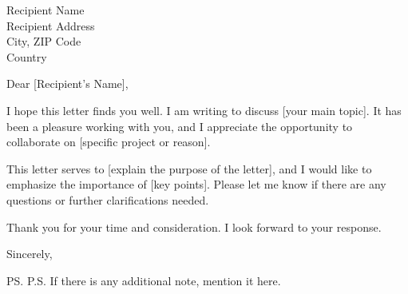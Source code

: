 \documentclass{letter}
\date{\today}
\begin{document}
%
    \begin{letter}{Recipient Name \\ Recipient Address \\ City, ZIP Code \\ Country}
        \opening{Dear [Recipient's Name],}

        I hope this letter finds you well. I am writing to discuss [your main topic]. It has been a pleasure working with you, and I appreciate the opportunity to collaborate on [specific project or reason].
        
        This letter serves to [explain the purpose of the letter], and I would like to emphasize the importance of [key points]. Please let me know if there are any questions or further clarifications needed.
        
        Thank you for your time and consideration. I look forward to your response.
        
        \closing{Sincerely,}
        
        \ps{P.S. If there is any additional note, mention it here.}
        
        
    \end{letter}%
\end{document}
